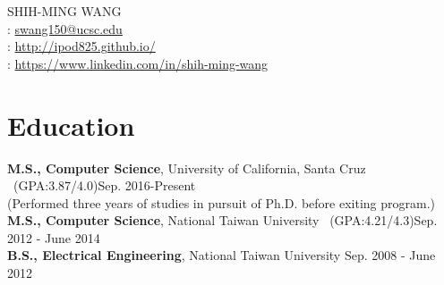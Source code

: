 \documentclass[a4paper,9pt]{article}
\begin{document}
\pagestyle{empty} %

\par{
    \center
{\Huge SHIH-MING WANG}\\
\faEnvelope: \href{mailto:swang150@ucsc.edu}{swang150@ucsc.edu} \\
\faUser: \href{http://ipod825.github.io/}{http://ipod825.github.io/}\\
\faLinkedin: \href{https://www.linkedin.com/in/shih-ming-wang-73aa3769/}{https://www.linkedin.com/in/shih-ming-wang}\\
\bigskip\par}

\section{Education}
    \textbf{M.S., Computer Science}, University of California, Santa Cruz \ (GPA:3.87/4.0)\hfill Sep. 2016-Present\\
    (Performed three years of studies in pursuit of Ph.D. before exiting program.)\\
    \textbf{M.S., Computer Science}, National Taiwan University \ (GPA:4.21/4.3)\hfill Sep. 2012 - June 2014 \\
    \textbf{B.S., Electrical Engineering}, National Taiwan University \hfill Sep. 2008 - June 2012


\end{document}
